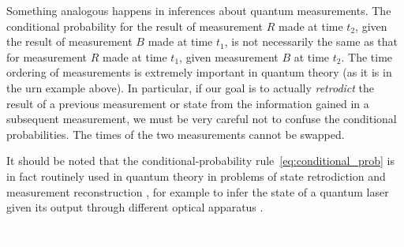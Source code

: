 \documentclass[\ifafour a4paper,12pt,\else a5paper,10pt,\fi%
onecolumn,oneside,article,%
british%
]{memoir}
\makeatletter
\theoremstyle{remark}
\theoremstyle{innote}
\def\sum{\DOTSI\sumop\slimits@}
\newcommand*{\mathte}[1]{\textbf{\textit{\textsf{#1}}}}
\newcommand*{\citep}{\parencites}%
\newcommand*{\de}{\partialup}%
\newcommand*{\p}{\mathrm{P}}%
\renewcommand*{\|}[1][]{\nonscript\,#1\vert\nonscript\;\mathopen{}}
\newcommand*{\sect}{\S}%
\newcommand*{\chaps}{chs}%
\newcommand*{\tsum}{\mathop{\textstyle\sum}\nolimits}
\newcommand*{\yM}{\mathte{M}}
\makeatother
\begin{document}
Something analogous \citep[see][for an exact parallel
see]{portamana2003_r2004} happens in inferences about quantum measurements.
The conditional probability for the result of measurement $R$ made at time
$t_{2}$, given the result of measurement $B$ made at time $t_{1}$, is not
necessarily the same as that for measurement $R$ made at time $t_{1}$,
given measurement $B$ at time $t_{2}$. The time ordering of measurements is
extremely important in quantum theory (as it is in the urn example above).
In particular, if our goal is to actually \emph{retrodict} the result of
a previous measurement or state from the information gained in a subsequent
measurement, we must be very careful not to confuse the conditional
probabilities. The times of the two measurements cannot be swapped.

It should be noted that the conditional-probability
rule~\eqref{eq:conditional_prob} is in fact routinely used in quantum
theory in problems of state retrodiction and measurement reconstruction
\citep{jones1991b,slater1995b}[\chaps~7,8]{demuynck2002b}{zimanetal2004_r2006,darianoetal2004}[see][\sect~1
for many further references]{maanssonetal2006},
for example to infer the state of a quantum laser given its output through
different optical apparatus \citep{leonhardt1997}.

\textcolor{white}{If you find this you can claim a postcard from me.}



\end{document}
